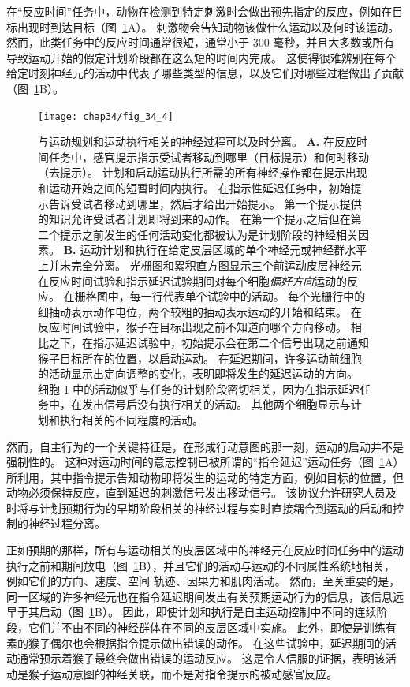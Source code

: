 在“反应时间”任务中，动物在检测到特定刺激时会做出预先指定的反应，例如在目标出现时到达目标（图~\ref{fig:34_4}A）。 
刺激物会告知动物该做什么运动以及何时该运动。
然而，此类任务中的反应时间通常很短，通常小于 300 毫秒，并且大多数或所有导致运动开始的假定计划阶段都在这么短的时间内完成。
这使得很难辨别在每个给定时刻神经元的活动中代表了哪些类型的信息，以及它们对哪些过程做出了贡献（图~\ref{fig:34_4}B）。


\begin{figure}[htbp]
	\centering
	\texttt{[image: chap34/fig\_34\_4]}
	\caption{与运动规划和运动执行相关的神经过程可以及时分离\cite{crammond2000prior}。
		\textbf{A.} 在反应时间任务中，感官提示指示受试者移动到哪里（目标提示）和何时移动（去提示）。
		计划和启动运动执行所需的所有神经操作都在提示出现和运动开始之间的短暂时间内执行。
		在指示性延迟任务中，初始提示告诉受试者移动到哪里，然后才给出开始提示。
		第一个提示提供的知识允许受试者计划即将到来的动作。
		在第一个提示之后但在第二个提示之前发生的任何活动变化都被认为是计划阶段的神经相关因素。
		\textbf{B.} 运动计划和执行在给定皮层区域的单个神经元或神经群水平上并未完全分离。
		光栅图和累积直方图显示三个前运动皮层神经元在反应时间试验和指示延迟试验期间对每个细胞\textit{偏好方向}运动的反应。
		在栅格图中，每一行代表单个试验中的活动。
		每个光栅行中的细抽动表示动作电位，两个较粗的抽动表示运动的开始和结束。
		在反应时间试验中，猴子在目标出现之前不知道向哪个方向移动。
		相比之下，在指示延迟试验中，初始提示会在第二个信号出现之前通知猴子目标所在的位置，以启动运动。
		在延迟期间，许多运动前细胞的活动显示出定向调整的变化，表明即将发生的延迟运动的方向。
		细胞 1 中的活动似乎与任务的计划阶段密切相关，因为在指示延迟任务中，在发出信号后没有执行相关的活动。
		其他两个细胞显示与计划和执行相关的不同程度的活动。}
	\label{fig:34_4}
\end{figure}


然而，自主行为的一个关键特征是，在形成行动意图的那一刻，运动的启动并不是强制性的。
这种对运动时间的意志控制已被所谓的“指令延迟”运动任务（图~\ref{fig:34_4}A）所利用，其中指令提示告知动物即将发生的运动的特定方面，例如目标的位置，但动物必须保持反应，直到延迟的刺激信号发出移动信号。
该协议允许研究人员及时将与计划预期行为的早期阶段相关的神经过程与实时直接耦合到运动的启动和控制的神经过程分离。


正如预期的那样，所有与运动相关的皮层区域中的神经元在反应时间任务中的运动执行之前和期间放电（图~\ref{fig:34_4}B），并且它们的活动与运动的不同属性系统地相关，例如它们的方向、速度、空间 轨迹、因果力和肌肉活动。
然而，至关重要的是，同一区域的许多神经元也在指令延迟期间发出有关预期运动行为的信息，该信息远早于其启动（图~\ref{fig:34_4}B）。
因此，即使计划和执行是自主运动控制中不同的连续阶段，它们并不由不同的神经群体在不同的皮层区域中实施。
此外，即使是训练有素的猴子偶尔也会根据指令提示做出错误的动作。
在这些试验中，延迟期间的活动通常预示着猴子最终会做出错误的运动反应。
这是令人信服的证据，表明该活动是猴子运动意图的神经关联，而不是对指令提示的被动感官反应。



